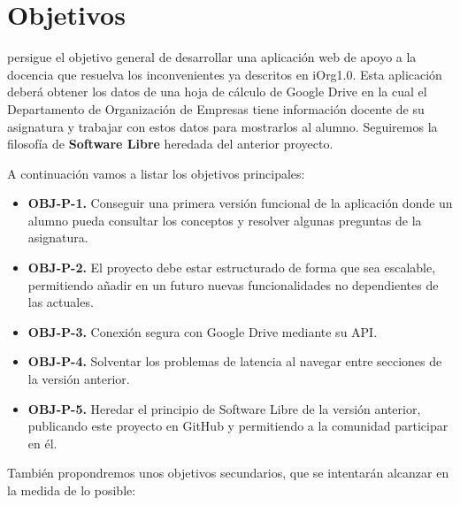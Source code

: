 \chapter{Objetivos}

{\titulo} persigue el objetivo general de desarrollar una aplicación web de apoyo a la docencia que resuelva los inconvenientes ya descritos en iOrg1.0. Esta aplicación deberá obtener los datos de una hoja de cálculo de Google Drive en la cual el Departamento de Organización de Empresas tiene información docente de su asignatura y trabajar con estos datos para mostrarlos al alumno. Seguiremos la filosofía de \textbf{Software Libre} heredada del anterior proyecto.


\bigskip
A continuación vamos a listar los objetivos principales:

\begin{itemize}
  \item \textbf{OBJ-P-1.} Conseguir una primera versión funcional de la aplicación donde un alumno pueda consultar los conceptos y resolver algunas preguntas de la asignatura.
  \item \textbf{OBJ-P-2.} El proyecto debe estar estructurado de forma que sea escalable, permitiendo añadir en un futuro nuevas funcionalidades no dependientes de las actuales.
  \item \textbf{OBJ-P-3.} Conexión segura con Google Drive mediante su API.
  \item \textbf{OBJ-P-4.} Solventar los problemas de latencia al navegar entre secciones de la versión anterior.
  \item \textbf{OBJ-P-5.} Heredar el principio de Software Libre de la versión anterior, publicando este proyecto en GitHub y permitiendo a la comunidad participar en él.
\end{itemize}


\bigskip
También propondremos unos objetivos secundarios, que se intentarán alcanzar en la medida de lo posible:

